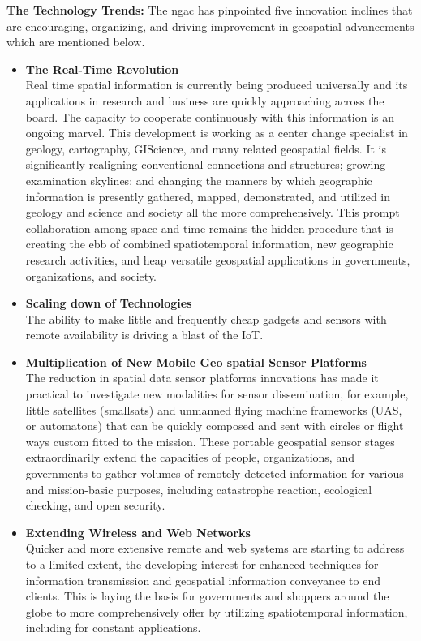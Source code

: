 \textbf{The Technology Trends:} The \gls{ngac} has pinpointed five innovation inclines that are encouraging, organizing, and driving improvement in geospatial advancements which are mentioned below. 

\begin{itemize}
  \item \textbf{The Real-Time Revolution} \\
 Real time spatial information is currently being produced universally and its applications in research and business are quickly approaching across the board. The capacity to cooperate continuously with this information is an ongoing marvel. This development is working as a center change specialist in geology, cartography, GIScience, and many related geospatial fields. It is significantly realigning conventional connections and structures; growing examination skylines; and changing the manners by which geographic information is presently gathered, mapped, demonstrated, and utilized in geology and science and society all the more comprehensively. This prompt collaboration among space and time remains the hidden procedure that is creating the ebb of combined spatiotemporal information, new geographic research activities, and heap versatile geospatial applications in governments, organizations, and society. 
  
  \item  \textbf{Scaling down of Technologies} \\
 The ability to make little and frequently cheap gadgets and sensors with remote availability is driving a blast of the \gls{IoT}.
  
  \item  \textbf{Multiplication of New Mobile Geo spatial Sensor Platforms} \\
  The reduction in spatial data sensor platforms innovations has made it practical to investigate new modalities for sensor dissemination, for example, little satellites (smallsats) and unmanned flying machine frameworks (UAS, or automatons) that can be quickly composed and sent with circles or flight ways custom fitted to the mission. These portable geospatial sensor stages extraordinarily extend the capacities of people, organizations, and governments to gather volumes of remotely detected information for various and mission-basic purposes, including catastrophe reaction, ecological checking, and open security. 
  
  \item  \textbf{Extending Wireless and Web Networks} \\
 Quicker and more extensive remote and web systems are starting to address to a limited extent, the developing interest for enhanced techniques for information transmission and geospatial information conveyance to end clients. This is laying the basis for governments and shoppers around the globe to more comprehensively offer by utilizing spatiotemporal information, including for constant applications. 
  

\end{itemize}
